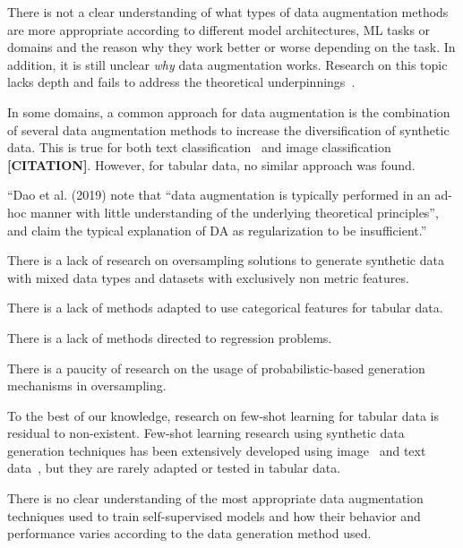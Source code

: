 \documentclass[parskip=full]{scrartcl}
\begin{document}
There is not a clear understanding of what types of data augmentation methods
are more appropriate according to different model architectures, ML tasks or
domains and the reason why they work better or worse depending on the task. 
In addition, it is still unclear \textit{why} data augmentation works.
Research on this topic lacks depth and fails to address the theoretical
underpinnings~\cite{feng2021survey}.

In some domains, a common approach for data augmentation is the combination of
several data augmentation methods to increase the diversification of synthetic
data. This is true for both text classification~\cite{bayer2021survey} and
image classification \textbf{[CITATION]}.  However, for tabular data, no
similar approach was found.


``Dao et al. (2019) note that ``data augmentation is typically performed in an
ad-hoc manner with little understanding of the underlying theoretical
principles'', and claim the typical explanation of DA as regularization to be
insufficient.''~\cite{feng2021survey}

There is a lack of research on oversampling solutions to generate synthetic
data with mixed data types and datasets with exclusively non metric features.

There is a lack of methods adapted to use categorical features for tabular
data.

There is a lack of methods directed to regression problems.

There is a paucity of research on the usage of probabilistic-based generation
mechanisms in oversampling.


To the best of our knowledge, research on few-shot learning for tabular data
is residual to non-existent. Few-shot learning research using synthetic data
generation techniques has been extensively developed using
image~\cite{cubuk2019autoaugment, zhao2019data} and text
data~\cite{zhou2021flipda}, but they are rarely adapted or tested in tabular
data.


There is no clear understanding of the most appropriate data augmentation
techniques used to train self-supervised models and how their behavior and
performance varies according to the data generation method used.

\end{document}
